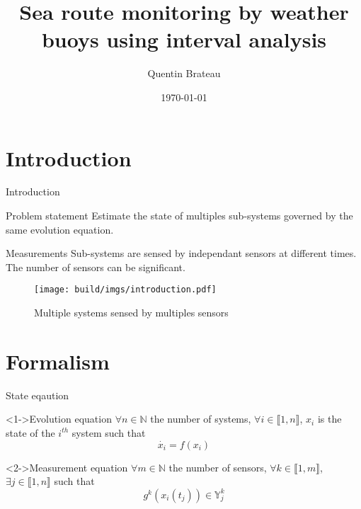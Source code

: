 \documentclass{beamer}
\title{Sea route monitoring by weather buoys using interval analysis}
\date{\today}
\author{Quentin Brateau}
\institute{ENSTA Bretagne}
\begin{document}
    \maketitle

    \section{Introduction}

        \begin{frame}{Introduction}
            \begin{minipage}{0.55\textwidth}
                \begin{block}{Problem statement}
                    Estimate the state of multiples sub-systems governed by the same evolution equation.
                \end{block}
                \begin{block}{Measurements}
                    Sub-systems are sensed by independant sensors at different times. The number of sensors can be significant.
                \end{block}
            \end{minipage}
            \hfill
            \begin{minipage}{0.4\textwidth}
                \begin{figure}
                    \texttt{[image: build/imgs/introduction.pdf]}
                    \caption{Multiple systems sensed by multiples sensors}
                \end{figure}
            \end{minipage}
        \end{frame}

    \section{Formalism}

        \begin{frame}{State eqaution}
            \begin{block}<1->{Evolution equation}
                $\forall n \in \mathbb{N}$ the number of systems, $\forall i \in \llbracket 1, n\rrbracket$, $x_i$ is the state of the $i^{th}$ system such that
                \begin{equation}
                    \dot{x_i} = f(x_i)
                \end{equation}
            \end{block}

            \begin{block}<2->{Measurement equation}
                $\forall m \in \mathbb{N}$ the number of sensors, $\forall k \in \llbracket 1, m\rrbracket$, $\exists j \in \llbracket 1, n\rrbracket$ such that
                \begin{equation}
                    g^k(x_i(t_j)) \in \mathbb{Y}_j^k
                \end{equation}
            \end{block}
        \end{frame}
\end{document}
